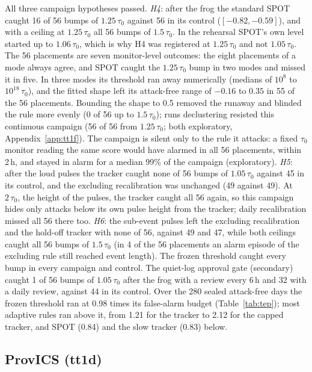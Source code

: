 \documentclass[letterpaper,twocolumn,10pt]{article}
\begin{document}
All three campaign hypotheses passed. \emph{H4}: after the frog the standard SPOT caught 16 of 56
bumps of $1.25\,\tau_0$ against 56 in its control ($[-0.82, -0.59]$), and with a ceiling at
$1.25\,\tau_0$ all 56 bumps of $1.5\,\tau_0$. In the rehearsal SPOT's own level started up to
$1.06\,\tau_0$, which is why H4 was registered at $1.25\,\tau_0$ and not $1.05\,\tau_0$. The 56 placements are
seven monitor-level outcomes: the eight placements of a mode always agree, and SPOT caught the
$1.25\,\tau_0$ bump in two modes and missed it in five. In three modes its threshold ran away
numerically (medians of $10^8$ to $10^{18}\,\tau_0$), and the fitted shape left its attack-free range of
$-0.16$ to $0.35$ in 55 of the 56 placements. Bounding the shape to 0.5 removed the runaway and blinded the rule
more evenly (0 of 56 up to $1.5\,\tau_0$); runs declustering resisted this continuous campaign (56 of
56 from $1.25\,\tau_0$; both exploratory, Appendix~\ref{app:tt1f}). The campaign is silent only to the
rule it attacks: a fixed $\tau_0$ monitor reading the same score would have alarmed in all 56
placements, within 2\,h, and stayed in alarm for a median 99\% of the campaign (exploratory). \emph{H5}:
after the loud pulses the tracker caught none of 56 bumps of $1.05\,\tau_0$ against 45 in its control,
and the excluding recalibration was unchanged (49 against 49). At $2\,\tau_0$, the height of the pulses,
the tracker caught all 56 again, so this campaign hides only attacks below its own pulse height from
the tracker; daily recalibration missed all 56 there too. \emph{H6}: the sub-event pulses left
the excluding recalibration and the hold-off tracker with none of 56, against 49 and 47, while both
ceilings caught all 56 bumps of $1.5\,\tau_0$ (in 4 of the 56 placements an alarm episode of the
excluding rule still reached event length). The frozen threshold caught every bump in every campaign
and control. The quiet-log approval gate (secondary) caught 1 of 56 bumps of $1.05\,\tau_0$ after the
frog with a review every 6\,h and 32 with a daily review, against 44 in its control. Over the 280
sealed attack-free days the frozen threshold ran at 0.98 times its false-alarm budget
(Table~\ref{tab:tep}); most adaptive rules ran above it, from 1.21 for the tracker to 2.12 for the
capped tracker, and SPOT (0.84) and the slow tracker (0.83) below.

\subsection{ProvICS (tt1d)}
\label{sec:provics}
\end{document}
